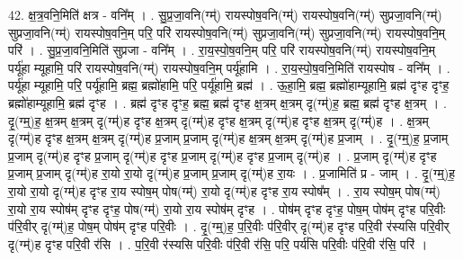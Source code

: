 \documentclass[17pt]{extarticle}
\begin{document}
42. क्ष॒त्र॒वनि॒मिति॑ क्षत्र - वनि᳚म् । . सु॒प्र॒जा॒वनि(ग्म्॑) रायस्पोष॒वनि(ग्म्॑) रायस्पोष॒वनि(ग्म्॑) सुप्रजा॒वनि(ग्म्॑) सुप्रजा॒वनि(ग्म्॑) रायस्पोष॒वनि॒म् परि॒ परि॑ रायस्पोष॒वनि(ग्म्॑) सुप्रजा॒वनि(ग्म्॑) सुप्रजा॒वनि(ग्म्॑) रायस्पोष॒वनि॒म् परि॑ । . सु॒प्र॒जा॒वनि॒मिति॑ सुप्रजा - वनि᳚म् । . रा॒य॒स्पो॒ष॒वनि॒म् परि॒ परि॑ रायस्पोष॒वनि(ग्म्॑) रायस्पोष॒वनि॒म् पर्यू॑हा म्यूहामि॒ परि॑ रायस्पोष॒वनि(ग्म्॑) रायस्पोष॒वनि॒म् पर्यू॑हामि । . रा॒य॒स्पो॒ष॒वनि॒मिति॑ रायस्पोष - वनि᳚म् । . पर्यू॑हा म्यूहामि॒ परि॒ पर्यू॑हामि॒ ब्रह्म॒ ब्रह्मो॑हामि॒ परि॒ पर्यू॑हामि॒ ब्रह्म॑ । . ऊ॒हा॒मि॒ ब्रह्म॒ ब्रह्मो॑हाम्यूहामि॒ ब्रह्म॑ दृꣳह दृꣳह॒ ब्रह्मो॑हाम्यूहामि॒ ब्रह्म॑ दृꣳह । . ब्रह्म॑ दृꣳह दृꣳह॒ ब्रह्म॒ ब्रह्म॑ दृꣳह क्ष॒त्रम् क्ष॒त्रम् दृ(ग्म्॑)ह॒ ब्रह्म॒ ब्रह्म॑ दृꣳह क्ष॒त्रम् । . दृ॒(ग्म्॒)ह॒ क्ष॒त्रम् क्ष॒त्रम् दृ(ग्म्॑)ह दृꣳह क्ष॒त्रम् दृ(ग्म्॑)ह दृꣳह क्ष॒त्रम् दृ(ग्म्॑)ह दृꣳह क्ष॒त्रम् दृ(ग्म्॑)ह । . क्ष॒त्रम् दृ(ग्म्॑)ह दृꣳह क्ष॒त्रम् क्ष॒त्रम् दृ(ग्म्॑)ह प्र॒जाम् प्र॒जाम् दृ(ग्म्॑)ह क्ष॒त्रम् क्ष॒त्रम् दृ(ग्म्॑)ह प्र॒जाम् । . दृ॒(ग्म्॒)ह॒ प्र॒जाम् प्र॒जाम् दृ(ग्म्॑)ह दृꣳह प्र॒जाम् दृ(ग्म्॑)ह दृꣳह प्र॒जाम् दृ(ग्म्॑)ह दृꣳह प्र॒जाम् दृ(ग्म्॑)ह । . प्र॒जाम् दृ(ग्म्॑)ह दृꣳह प्र॒जाम् प्र॒जाम् दृ(ग्म्॑)ह रा॒यो रा॒यो दृ(ग्म्॑)ह प्र॒जाम् प्र॒जाम् दृ(ग्म्॑)ह रा॒यः । . प्र॒जामिति॑ प्र - जाम् । . दृ॒(ग्म्॒)ह॒ रा॒यो रा॒यो दृ(ग्म्॑)ह दृꣳह रा॒य स्पोष॒म् पोष(ग्म्॑) रा॒यो दृ(ग्म्॑)ह दृꣳह रा॒य स्पोष᳚म् । . रा॒य स्पोष॒म् पोष(ग्म्॑) रा॒यो रा॒य स्पोष॑म् दृꣳह दृꣳह॒ पोष(ग्म्॑) रा॒यो रा॒य स्पोष॑म् दृꣳह । . पोष॑म् दृꣳह दृꣳह॒ पोष॒म् पोष॑म् दृꣳह परि॒वीः प॑रि॒वीर् दृ(ग्म्॑)ह॒ पोष॒म् पोष॑म् दृꣳह परि॒वीः । . दृ॒(ग्म्॒)ह॒ प॒रि॒वीः प॑रि॒वीर् दृ(ग्म्॑)ह दृꣳह परि॒वी र॑स्यसि परि॒वीर् दृ(ग्म्॑)ह दृꣳह परि॒वी र॑सि । . प॒रि॒वी र॑स्यसि परि॒वीः प॑रि॒वी र॑सि॒ परि॒ पर्य॑सि परि॒वीः प॑रि॒वी र॑सि॒ परि॑ । \newline
\end{document}
